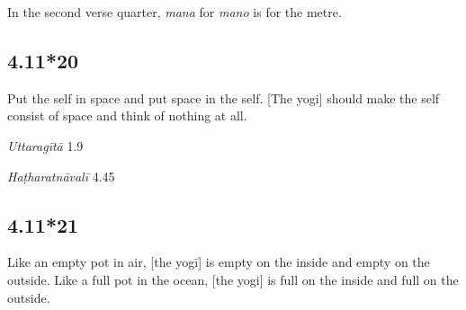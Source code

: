 \begin{ekdosis}
\begin{philcomm}[hp04_011_19]
In the second verse quarter, \emph{mana} for \emph{mano} is for the metre.
\end{philcomm}

\subsection*{4.11*20}
\begin{translation}[hp04_011_20]
Put the self in space and put space in the self. [The yogi] should make the self consist of space and think of nothing at all.
\end{translation}

\begin{sources}[hp04_011_20]
\emph{Uttaragītā} 1.9
\begin{versinnote}
\end{versinnote}
\end{sources}

\begin{testimonia}[hp04_011_20]
\emph{Haṭharatnāvalī} 4.45
\begin{versinnote}
\end{versinnote}
\end{testimonia}


\subsection*{4.11*21}
\begin{translation}[hp04_011_21]
Like an empty pot in air, [the yogī] is empty on the inside and empty on the outside. Like a full pot in the ocean, [the yogi] is full on the inside and full on the outside.%
\end{translation}


\end{ekdosis}
